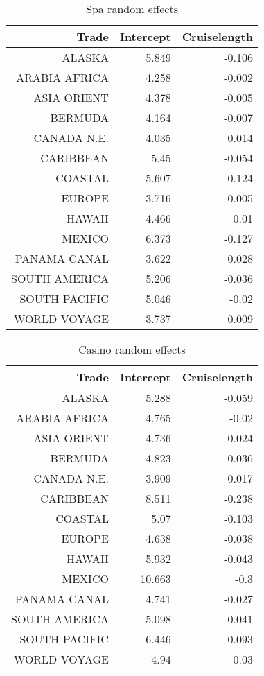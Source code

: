 \documentclass{article}
\begin{document}
	\begin{table}[H]
		\centering 
		\begin{tabular}{rrr}
			Trade & Intercept & Cruiselength \\ 
			\hline 
			\hline 
			ALASKA & 5.849 & -0.106 \\
			ARABIA AFRICA & 4.258 & -0.002 \\
			ASIA ORIENT & 4.378 & -0.005 \\
			BERMUDA & 4.164 & -0.007 \\
			CANADA N.E. & 4.035 & 0.014 \\
			CARIBBEAN & 5.45 & -0.054 \\
			COASTAL & 5.607 & -0.124 \\
			EUROPE & 3.716 & -0.005 \\
			HAWAII & 4.466 & -0.01 \\
			MEXICO & 6.373 & -0.127 \\
			PANAMA CANAL & 3.622 & 0.028 \\
			SOUTH AMERICA & 5.206 & -0.036 \\
			SOUTH PACIFIC & 5.046 & -0.02 \\
			WORLD VOYAGE & 3.737 & 0.009 \\
			\hline 
			\hline 
		\end{tabular}
		\caption{Spa random effects}
	\end{table}
	
	\begin{table}[H]
		\centering
		\begin{tabular}{rrr}
			Trade & Intercept & Cruiselength \\ 
			\hline 
			\hline 
			ALASKA & 5.288 & -0.059 \\
			ARABIA  AFRICA & 4.765 & -0.02 \\
			ASIA ORIENT & 4.736 & -0.024 \\
			BERMUDA & 4.823 & -0.036 \\
			CANADA N.E. & 3.909 & 0.017 \\
			CARIBBEAN & 8.511 & -0.238 \\
			COASTAL & 5.07 & -0.103 \\
			EUROPE & 4.638 & -0.038 \\
			HAWAII & 5.932 & -0.043 \\
			MEXICO & 10.663 & -0.3 \\
			PANAMA CANAL & 4.741 & -0.027 \\
			SOUTH AMERICA & 5.098 & -0.041 \\
			SOUTH PACIFIC & 6.446 & -0.093 \\
			WORLD VOYAGE & 4.94 & -0.03 \\
			\hline 
			\hline 
		\end{tabular}
		\caption{Casino random effects}
	\end{table}
	
\end{document}
